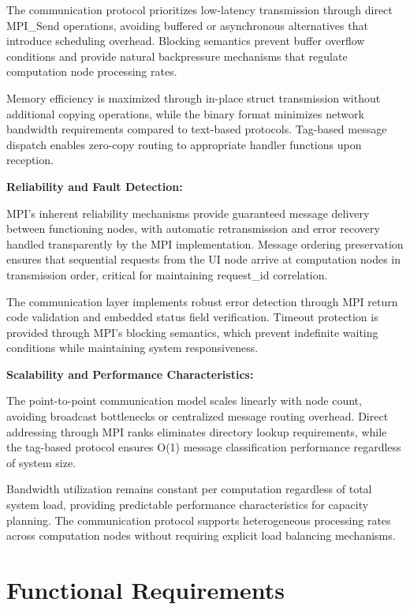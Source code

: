 \documentclass{article}
\begin{document}
The communication protocol prioritizes low-latency transmission through direct MPI\_Send operations, avoiding buffered or asynchronous alternatives that introduce scheduling overhead. Blocking semantics prevent buffer overflow conditions and provide natural backpressure mechanisms that regulate computation node processing rates.

Memory efficiency is maximized through in-place struct transmission without additional copying operations, while the binary format minimizes network bandwidth requirements compared to text-based protocols. Tag-based message dispatch enables zero-copy routing to appropriate handler functions upon reception.

\textbf{Reliability and Fault Detection:}

MPI's inherent reliability mechanisms provide guaranteed message delivery between functioning nodes, with automatic retransmission and error recovery handled transparently by the MPI implementation. Message ordering preservation ensures that sequential requests from the UI node arrive at computation nodes in transmission order, critical for maintaining request\_id correlation.

The communication layer implements robust error detection through MPI return code validation and embedded status field verification. Timeout protection is provided through MPI's blocking semantics, which prevent indefinite waiting conditions while maintaining system responsiveness.

\textbf{Scalability and Performance Characteristics:}

The point-to-point communication model scales linearly with node count, avoiding broadcast bottlenecks or centralized message routing overhead. Direct addressing through MPI ranks eliminates directory lookup requirements, while the tag-based protocol ensures O(1) message classification performance regardless of system size.

Bandwidth utilization remains constant per computation regardless of total system load, providing predictable performance characteristics for capacity planning. The communication protocol supports heterogeneous processing rates across computation nodes without requiring explicit load balancing mechanisms.



\section{Functional Requirements}
\end{document}
